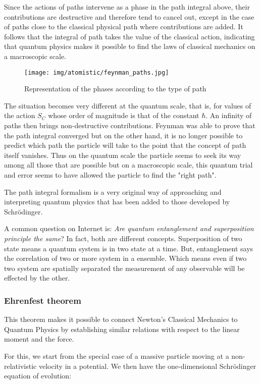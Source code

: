 	Since the actions of paths intervene as a phase in the path integral above, their contributions are destructive and therefore tend to cancel out, except in the case of paths close to the classical physical path where contributions are added. It follows that the integral of path takes the value of the classical action, indicating that quantum physics makes it possible to find the laws of classical mechanics on a macroscopic scale.
	\begin{figure}[H]
		\centering
		\texttt{[image: img/atomistic/feynman\_paths.jpg]}	
		\caption{Representation of the phases according to the type of path}
	\end{figure}
	The situation becomes very different at the quantum scale, that is, for values of the action $S_C$ whose order of magnitude is that of the constant $\hbar$. An infinity of paths then brings non-destructive contributions. Feynman was able to prove that the path integral converged but on the other hand, it is no longer possible to predict which path the particle will take to the point that the concept of path itself vanishes. Thus on the quantum scale the particle seems to seek its way among all those that are possible but on a macroscopic scale, this quantum trial and error seems to have allowed the particle to find the "right path".

	The path integral formalism is a very original way of approaching and interpreting quantum physics that has been added to those developed by Schrödinger.	 
	\begin{tcolorbox}[title=Remark,colframe=black,arc=10pt]
	A common question on Internet is: \textit{Are quantum entanglement and superposition principle the same}? In fact, both are different concepts. Superposition of two state means a quantum system is in two state at a time. But, entanglement says the correlation of two or more system in a ensemble. Which means even if two two system are spatially separated the measurement of any observable will be effected by the other.
	\end{tcolorbox}
	
	\pagebreak
	\subsubsection{Ehrenfest theorem}
	This theorem makes it possible to connect Newton's Classical Mechanics to Quantum Physics by establishing similar relations with respect to the linear moment and the force.

	For this, we start from the special case of a massive particle moving at a non-relativistic velocity in a potential. We then have the one-dimensional Schrödinger equation of evolution:
	
